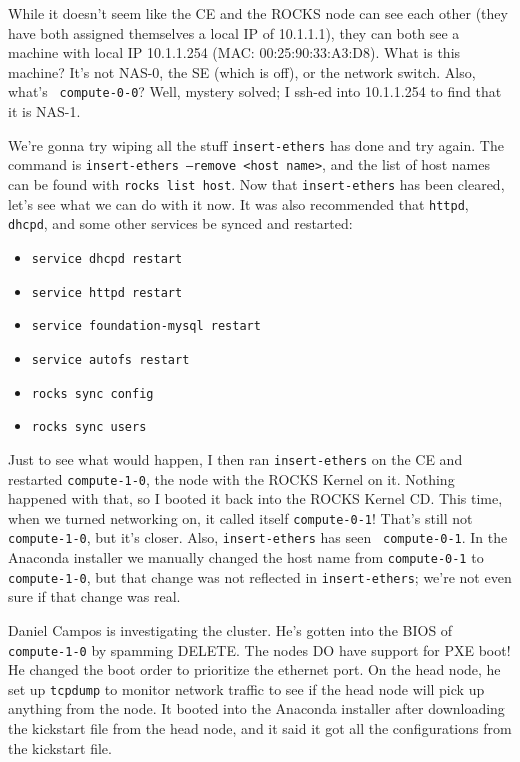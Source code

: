 \documentclass[12pt]{article}
\begin{document}
\qq While it doesn't seem like the CE and the ROCKS node can see each other
(they have both assigned themselves a local IP of 10.1.1.1), they can both see a
machine with local IP 10.1.1.254 (MAC: 00:25:90:33:A3:D8). What is this machine?
It's not NAS-0, the SE (which is off), or the network switch. Also, what's {\tt
  compute-0-0}? Well, mystery solved; I ssh-ed into 10.1.1.254 to find that it
is NAS-1. 

\qq We're gonna try wiping all the stuff {\tt insert-ethers} has done and try
again. The command is {\tt insert-ethers --remove <host name>}, and the list of
host names can be found with {\tt rocks list host}. Now that {\tt insert-ethers}
has been cleared, let's see what we can do with it now. It was also recommended
that {\tt httpd}, {\tt dhcpd}, and some other services be synced and restarted:

\begin{itemize}
\item {\tt service dhcpd restart}
\item {\tt service httpd restart}
\item {\tt service foundation-mysql restart}
\item {\tt service autofs restart}
\item {\tt rocks sync config}
\item {\tt rocks sync users}
\end{itemize}

Just to see what would happen, I then ran {\tt insert-ethers} on the CE and
restarted {\tt compute-1-0}, the node with the ROCKS Kernel on it. Nothing
happened with that, so I booted it back into the ROCKS Kernel CD. This time,
when we turned networking on, it called itself {\tt compute-0-1}! That's still
not {\tt compute-1-0}, but it's closer. Also, {\tt insert-ethers} has seen {\tt
  compute-0-1}. In the Anaconda installer we manually changed the host name from
{\tt compute-0-1} to {\tt compute-1-0}, but that change was not reflected in
{\tt insert-ethers}; we're not even sure if that change was real.

\qq Daniel Campos is investigating the cluster. He's gotten into the BIOS of
{\tt compute-1-0} by spamming DELETE. The nodes DO have support for
PXE boot! He changed the boot order to prioritize the ethernet port. On the head
node, he set up {\tt tcpdump} to monitor network traffic to see if the head node
will pick up anything from the node. It booted into the Anaconda installer after
downloading the kickstart file from the head node, and it said it got all the
configurations from the kickstart file. 

\end{document}
